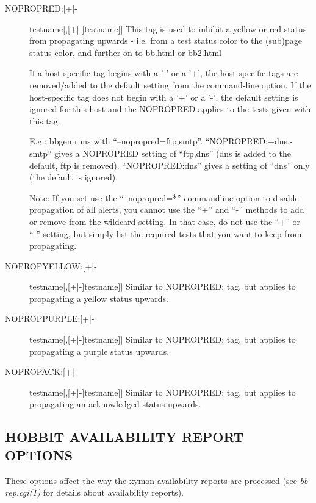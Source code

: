 \begin{description}
\item[NOPROPRED:[+|-]testname[,[+|-]testname]] This tag is used to
  inhibit a yellow or red status from propagating upwards - i.e. from
  a test status color to the (sub)page status color, and further on to
  bb.html or bb2.html 


  If a host-specific tag begins with a '-' or a '+', the host-specific
  tags are removed/added to the default setting from the command-line
  option. If the host-specific tag does not begin with a '+' or a '-',
  the default setting is ignored for this host and the NOPROPRED
  applies to the tests given with this tag. 



  E.g.: bbgen runs with
  ``--nopropred=ftp,smtp''. ``NOPROPRED:+dns,-smtp'' gives a NOPROPRED
  setting of ``ftp,dns'' (dns is added to the default, ftp is
  removed). ``NOPROPRED:dns'' gives a setting of ``dns'' only (the
  default is ignored). 



  Note: If you set use the ``--nopropred=*'' commandline option to
  disable propagation of all alerts, you cannot use the ``+'' and
  ``-'' methods to add or remove from the wildcard setting. In that
  case, do not use the ``+'' or ``-'' setting, but simply list the
  required tests that you want to keep from propagating. 



 

\item[NOPROPYELLOW:[+|-]testname[,[+|-]testname]] Similar to
  NOPROPRED: tag, but applies to propagating a yellow status upwards. 


 

\item[NOPROPPURPLE:[+|-]testname[,[+|-]testname]] Similar to
  NOPROPRED: tag, but applies to propagating a purple status upwards. 


 

\item[NOPROPACK:[+|-]testname[,[+|-]testname]] Similar to NOPROPRED:
  tag, but applies to propagating an acknowledged status upwards. 


 


 


\end{description}

\subsection{HOBBIT AVAILABILITY REPORT OPTIONS}
 These options affect the way the xymon availability reports are processed (see \emph{bb-rep.cgi(1)}
 for details about availability reports). 

